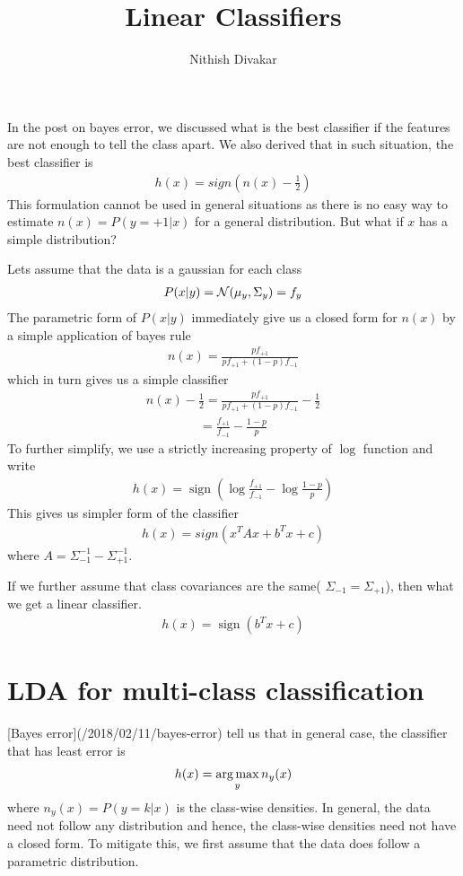 \documentclass[12pt,crop=false,class=article,convert={density=300,outext=.compiled.png}]{standalone}
\title{\Huge Linear Classifiers}
\date{}
\author{Nithish Divakar}
\begin{document}
\maketitle

In the post on bayes error, we discussed what
is the best classifier if the features are not enough to tell the class
apart. We also derived that in such situation, the best classifier is
\begin{align*}
  h(x) = sign \left( n(x) - \frac{1}{2} \right) 
\end{align*}
%
 This
formulation cannot be used in general situations as there is no easy way
to estimate $n(x) = P(y=+1|x)$ for a general distribution. But what if
$x$ has a simple distribution?

Lets assume that the data is a gaussian for each class%
\begin{align*}
P(x|y) = \operatorname{\mathcal{N}}(\mu_y,\Sigma_y) = f_y
\end{align*}
%
 The parametric form of
$P(x|y)$ immediately give us a closed form for $n(x)$ by a simple
application of bayes rule
%
\begin{align*}
 n(x) = \frac{pf_{+1}}{p f_{+1}+(1-p)f_{-1}}
\end{align*}
%
which in turn gives us a simple classifier
%
\begin{align*}
 n(x) - \frac{1}{2} = \frac{pf_{+1}}{pf_{+1}+(1-p)f_{-1}} - \frac{1}{2} 
\end{align*}
%
%
\begin{align*}
 = \frac{f_{+1}}{f_{-1}} - \frac{1-p}{p} 
\end{align*}
%
To further simplify, we use a strictly increasing property of $\log$
function and write
%
\begin{align*}
  h(x) = \operatorname{sign} \left( \log \frac{f_{+1}}{f_{-1}}- \log\frac{1-p}{p} \right)
\end{align*}
%
This gives us simpler form of the classifier
%
\begin{align*}
 h(x) = sign(x^TAx + b^Tx+c)
\end{align*}
%
 where
$A = \Sigma_{-1}^{-1}-\Sigma_{+1}^{-1}$.

If we further assume that class covariances are the same(
$\Sigma_{-1}=\Sigma_{+1}$), then what we get a linear classifier.
\begin{align*}
  h(x) = \operatorname{sign}(b^Tx+c)
\end{align*}
%
\section*{LDA for multi-class classification}
[Bayes error](/2018/02/11/bayes-error) tell us that in general case, the
classifier that has least error is
%
\begin{align*}
   h(x) = \operatorname*{arg\,max}_y n_y(x) 
\end{align*}
%
 where
$n_y(x) = P(y=k|x)$ is the class-wise densities. In general, the data
need not follow any distribution and hence, the class-wise densities
need not have a closed form. To mitigate this, we first assume that the
data does follow a parametric distribution.
\end{document}
